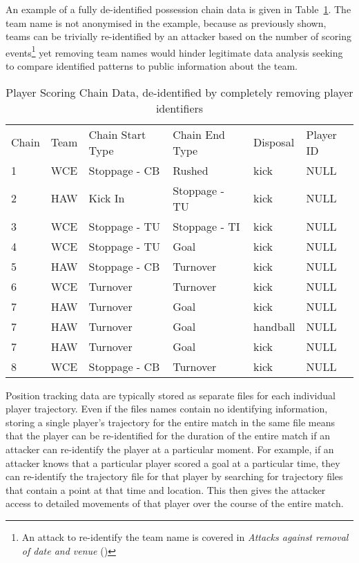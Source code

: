 An example of a fully de-identified possession chain data is given in Table~\ref{tab:chains-v2}. The team name is not anonymised in the example, because as previously shown, teams can be trivially re-identified by an attacker based on the number of scoring events\footnote{An attack to re-identify the team name is covered in \textit{Attacks against removal of date and venue} ()} yet removing team names would hinder legitimate data analysis seeking to compare identified patterns to public information about the team.

\begin{table}[htbp]
\centering
\caption{Player Scoring Chain Data, de-identified by completely removing player identifiers}%
\label{tab:chains-v2}
\begin{tabular}{llllll}
Chain & Team & Chain Start Type & Chain End Type & Disposal & Player ID \\
1     & WCE  & Stoppage - CB    & Rushed         & kick     & NULL      \\
2     & HAW  & Kick In          & Stoppage - TU  & kick     & NULL      \\
3     & WCE  & Stoppage - TU    & Stoppage - TI  & kick     & NULL      \\
4     & WCE  & Stoppage - TU    & Goal           & kick     & NULL      \\
5     & HAW  & Stoppage - CB    & Turnover       & kick     & NULL      \\
6     & WCE  & Turnover         & Turnover       & kick     & NULL      \\
7     & HAW  & Turnover         & Goal           & kick     & NULL      \\
7     & HAW  & Turnover         & Goal           & handball & NULL      \\
7     & HAW  & Turnover         & Goal           & kick     & NULL      \\
8     & WCE  & Stoppage - CB    & Turnover       & kick     & NULL      \\
\end{tabular}
\end{table}

Position tracking data are typically stored as separate files for each individual player trajectory. Even if the files names contain no identifying information, storing a single player's trajectory for the entire match in the same file means that the player can be re-identified for the duration of the entire match if an attacker can re-identify the player at a particular moment. For example, if an attacker knows that a particular player scored a goal at a particular time, they can re-identify the trajectory file for that player by searching for trajectory files that contain a point at that time and location. This then gives the attacker access to detailed movements of that player over the course of the entire match.

